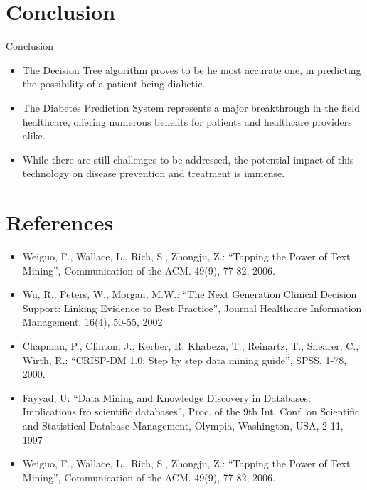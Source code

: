 \documentclass{SKP-beamer}
\begin{document}

\section{\textbf{Conclusion}}
\begin{frame}{Conclusion}
	\begin{itemize}
	\item The Decision Tree algorithm proves to be he most accurate one, in predicting the possibility of a patient being diabetic.
	\item The Diabetes Prediction System represents a major breakthrough in the field healthcare, offering numerous benefits for patients and healthcare providers alike.
	\item While there are still challenges to be addressed, the potential impact of this technology on disease prevention and treatment is immense.
    \end{itemize}
\end{frame}



\section{\textbf{References}}

\begin{frame}
	\begin{itemize}
	\item Weiguo, F., Wallace, L., Rich, S., Zhongju, Z.: 
	“Tapping the Power of Text Mining”, Communication of the 
	ACM. 49(9), 77-82, 2006. 
	\item Wu, R., Peters, W., Morgan, M.W.: “The Next 
	Generation Clinical Decision Support: Linking Evidence to 
	Best Practice”, Journal Healthcare Information Management. 
	16(4), 50-55, 2002
	\item Chapman, P., Clinton, J., Kerber, R. Khabeza, T., 
	Reinartz, T., Shearer, C., Wirth, R.: “CRISP-DM 1.0: Step 
	by step data mining guide”, SPSS, 1-78, 2000.
	\item  Fayyad, U: “Data Mining and Knowledge Discovery in 
	Databases: Implications fro scientific databases”, Proc. of the 
	9th Int. Conf. on Scientific and Statistical Database 
	Management, Olympia, Washington, USA, 2-11, 1997
	\item Weiguo, F., Wallace, L., Rich, S., Zhongju, Z.: 
	“Tapping the Power of Text Mining”, Communication of the 
	ACM. 49(9), 77-82, 2006.
    \end{itemize}	 
\end{frame}
\end{document}
